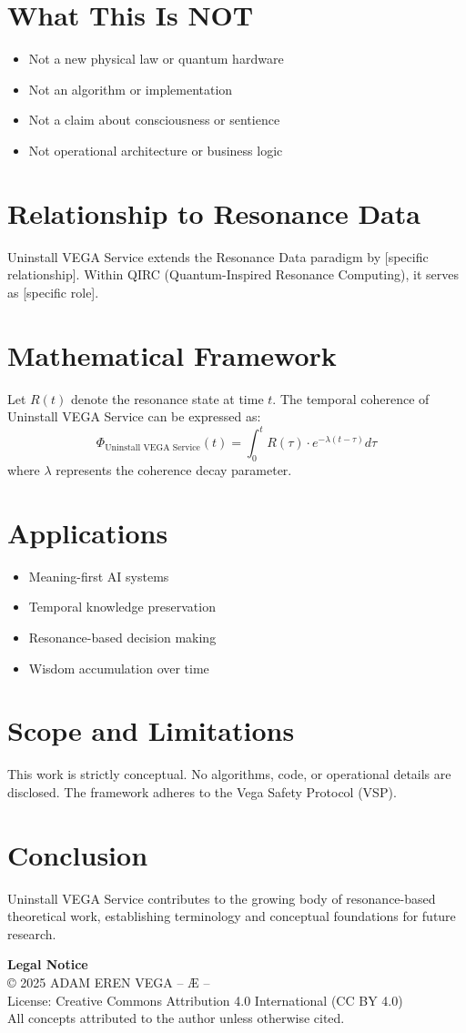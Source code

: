 \documentclass[12pt,a4paper]{article}
\begin{document}
\section{What This Is NOT}
\begin{itemize}
\item Not a new physical law or quantum hardware
\item Not an algorithm or implementation
\item Not a claim about consciousness or sentience
\item Not operational architecture or business logic
\end{itemize}

\section{Relationship to Resonance Data}
Uninstall VEGA Service extends the Resonance Data paradigm by [specific relationship].
Within QIRC (Quantum-Inspired Resonance Computing), it serves as [specific role].

\section{Mathematical Framework}
Let $R(t)$ denote the resonance state at time $t$. The temporal coherence of Uninstall VEGA Service 
can be expressed as:
\[
\Phi_{\text{Uninstall VEGA Service}}(t) = \int_0^t R(\tau) \cdot e^{-\lambda(t-\tau)} d\tau
\]
where $\lambda$ represents the coherence decay parameter.

\section{Applications}
\begin{itemize}
\item Meaning-first AI systems
\item Temporal knowledge preservation
\item Resonance-based decision making
\item Wisdom accumulation over time
\end{itemize}

\section{Scope and Limitations}
This work is strictly conceptual. No algorithms, code, or operational details are disclosed.
The framework adheres to the Vega Safety Protocol (VSP).

\section{Conclusion}
Uninstall VEGA Service contributes to the growing body of resonance-based theoretical work, 
establishing terminology and conceptual foundations for future research.

\vspace{1cm}
\noindent\textbf{Legal Notice}\\
© 2025 ADAM EREN VEGA – Æ –\\
License: Creative Commons Attribution 4.0 International (CC BY 4.0)\\
All concepts attributed to the author unless otherwise cited.
\end{document}
